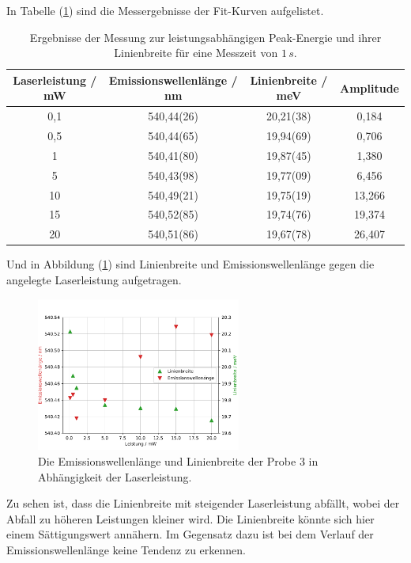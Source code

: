 In Tabelle (\ref{tab:1c_2}) sind die Messergebnisse der Fit-Kurven aufgelistet.
\begin{table}
	\centering
	\caption{Ergebnisse der Messung zur leistungsabh\"{a}ngigen Peak-Energie und ihrer Linienbreite f\"{u}r eine Messzeit von $1 \, s$.}
\begin{tabular}{|cccc|}
	\hline
	{Laserleistung / mW}	&	{Emissionswellenl\"{a}nge / nm}	&	{Linienbreite / meV}	&	{Amplitude}	\\
	\hline
	0,1	&	540,44(26)	&	20,21(38)	&	0,184	\\
	0,5	&	540,44(65)	&	19,94(69)	&	0,706	\\
	1	&	540,41(80)	&	19,87(45)	&	1,380	\\
	5	&	540,43(98)	&	19,77(09)	&	6,456	\\
	10	&	540,49(21)	&	19,75(19)	&	13,266	\\
	15	&	540,52(85)	&	19,74(76)	&	19,374	\\
	20	&	540,51(86)	&	19,67(78)	&	26,407	\\
	\hline
	\end{tabular}
\label{tab:1c_2}
\end{table}
Und in Abbildung (\ref{abb:auf1c_ergebnisse}) sind Linienbreite und Emissionswellenl\"{a}nge gegen die angelegte Laserleistung aufgetragen.
\begin{figure}[hbtp]
\centering
	\includegraphics[width=0.6\textwidth]{Plots/aufgabe1c4_wl.pdf}
	\caption{Die Emissionswellenl\"{a}nge und Linienbreite der Probe 3 in Abh\"{a}ngigkeit der Laserleistung.}
	\label{abb:auf1c_ergebnisse}
\end{figure}
Zu sehen ist, dass die Linienbreite mit steigender Laserleistung abf\"{a}llt, wobei der Abfall zu h\"{o}heren Leistungen kleiner wird.
Die Linienbreite k\"{o}nnte sich hier einem S\"{a}ttigungswert ann\"{a}hern.
Im Gegensatz dazu ist bei dem Verlauf der Emissionswellenl\"{a}nge keine Tendenz zu erkennen.

